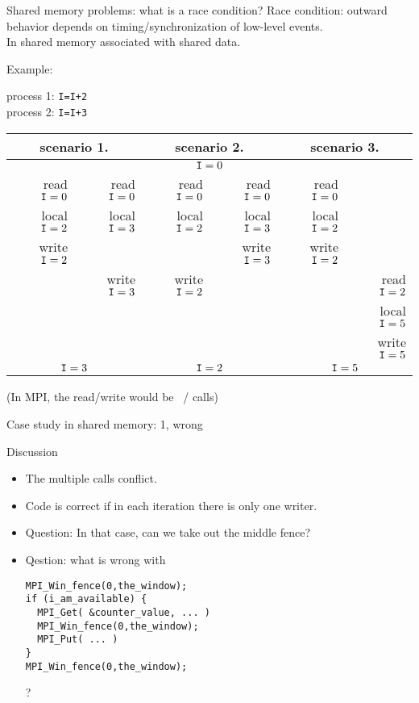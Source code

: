 \begin{numberedframe}{Shared memory problems: what is a race condition?}
  \scriptsize
  Race condition: outward behavior depends on
  timing/synchronization of low-level events.\\
  In shared memory associated with shared data.

  Example:
  \begin{tabbing}
    process 1: \texttt{I=I+2}\\
    process 2: \texttt{I=I+3}
  \end{tabbing}
  \begin{tabular}{|rr|rr|rr|}
    \hline
    \multicolumn{2}{|c|}{scenario 1.}& \multicolumn{2}{|c|}{scenario 2.}&
    \multicolumn{2}{|c|}{scenario 3.}\\ \hline
    \multicolumn{6}{|c|}{$\n{I}=0$}\\ \hline
    read $\n{I}=0$&read $\n{I}=0$&
    read $\n{I}=0$&read $\n{I}=0$&
    read $\n{I}=0$& \\
    local $\n{I}=2$&local $\n{I}=3$& 
    local $\n{I}=2$&local $\n{I}=3$&
    local $\n{I}=2$& \\
    write $\n{I}=2$& & &write $\n{I}=3$&write $\n{I}=2$& \\
    &write $\n{I}=3$&write $\n{I}=2$& & &read $\n{I}=2$\\
    &&&&&local $\n{I}=5$\\
    &&&&&write $\n{I}=5$\\
    \hline
    \multicolumn{2}{|c|}{$\n{I}=3$}& \multicolumn{2}{|c|}{$\n{I}=2$}&
    \multicolumn{2}{|c|}{$\n{I}=5$}\\ \hline
  \end{tabular}

  (In MPI, the read/write would be ~/  calls)
\end{numberedframe}

\begin{numberedframe}{Case study in shared memory: 1, wrong}
  \label{sl:fetchput}
\end{numberedframe}

\begin{numberedframe}{Discussion}
  \begin{itemize}
  \item The multiple  calls conflict.
  \item Code is correct if in each iteration there is only one writer.
  \item Question: In that case, can we take out the middle fence?
  \item Qestion: what is wrong with
\begin{lstlisting}
MPI_Win_fence(0,the_window);
if (i_am_available) {
  MPI_Get( &counter_value, ... )
  MPI_Win_fence(0,the_window);
  MPI_Put( ... )      
}
MPI_Win_fence(0,the_window);
\end{lstlisting}
?
  \end{itemize}
\end{numberedframe}

